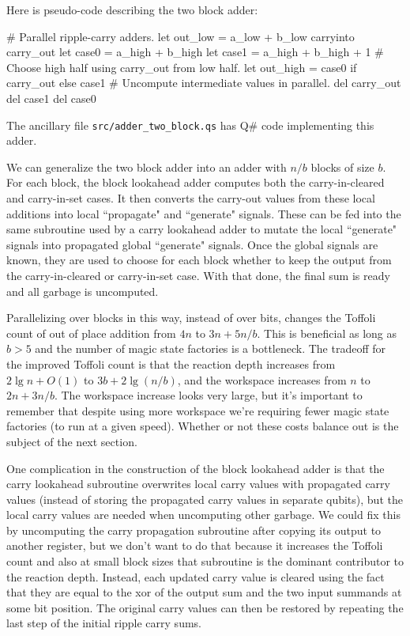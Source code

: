 \documentclass[onecolumn,unpublished]{quantumarticle}
\theoremstyle{definition}
\theoremstyle{definition}
\theoremstyle{definition}
\begin{document}
Here is pseudo-code describing the two block adder:

\begin{python}
    # Parallel ripple-carry adders.
    let out_low = a_low + b_low carryinto carry_out
    let case0 = a_high + b_high
    let case1 = a_high + b_high + 1
    # Choose high half using carry_out from low half.
    let out_high = case0 if carry_out else case1
    # Uncompute intermediate values in parallel.
    del carry_out
    del case1
    del case0
\end{python}

The ancillary file \texttt{src/adder\_two\_block.qs} has Q\# code implementing this adder.

We can generalize the two block adder into an adder with $n/b$ blocks of size $b$.
For each block, the block lookahead adder computes both the carry-in-cleared and carry-in-set cases.
It then converts the carry-out values from these local additions into local ``propagate" and ``generate" signals.
These can be fed into the same subroutine used by a carry lookahead adder to mutate the local ``generate" signals into propagated global ``generate" signals.
Once the global signals are known, they are used to choose for each block whether to keep the output from the carry-in-cleared or carry-in-set case.
With that done, the final sum is ready and all garbage is uncomputed.

Parallelizing over blocks in this way, instead of over bits, changes the Toffoli count of out of place addition from $4n$ to $3n + 5n/b$.
This is beneficial as long as $b > 5$ and the number of magic state factories is a bottleneck.
The tradeoff for the improved Toffoli count is that the reaction depth increases from $2 \lg n + O(1)$ to $3 b + 2 \lg(n/b)$, and the workspace increases from $n$ to $2n + 3n/b$.
The workspace increase looks very large, but it's important to remember that despite using more workspace we're requiring fewer magic state factories (to run at a given speed).
Whether or not these costs balance out is the subject of the next section.

One complication in the construction of the block lookahead adder is that the carry lookahead subroutine overwrites local carry values with propagated carry values (instead of storing the propagated carry values in separate qubits), but the local carry values are needed when uncomputing other garbage.
We could fix this by uncomputing the carry propagation subroutine after copying its output to another register, but we don't want to do that because it increases the Toffoli count and also at small block sizes that subroutine is the dominant contributor to the reaction depth.
Instead, each updated carry value is cleared using the fact that they are equal to the xor of the output sum and the two input summands at some bit position.
The original carry values can then be restored by repeating the last step of the initial ripple carry sums.
\end{document}
